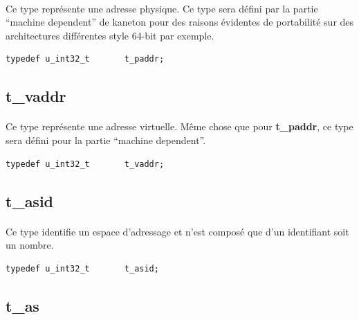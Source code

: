 \documentclass[10pt,a4wide]{article}
\begin{document}
\paragraph{}

Ce type repr\'esente une adresse physique. Ce type sera d\'efini par la
partie ``machine dependent'' de kaneton pour des raisons \'evidentes de
portabilit\'e sur des architectures diff\'erentes style 64-bit par exemple.

\begin{verbatim}
typedef u_int32_t       t_paddr;
\end{verbatim}

\subsection{t\_vaddr}

\paragraph{}

Ce type repr\'esente une adresse virtuelle. M\^eme chose que pour
\textbf{t\_paddr}, ce type sera d\'efini pour la partie ``machine dependent''.

\begin{verbatim}
typedef u_int32_t       t_vaddr;
\end{verbatim}

\subsection{t\_asid}

\paragraph{}

Ce type identifie un espace d'adressage et n'est compos\'e que
d'un identifiant soit un nombre.

\begin{verbatim}
typedef u_int32_t       t_asid;
\end{verbatim}

\subsection{t\_as}

\paragraph{}
\end{document}
